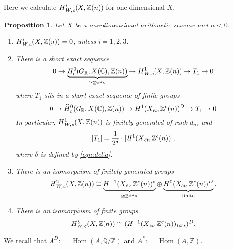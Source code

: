 \documentclass[draft]{article}
\DeclareMathOperator{\Hom}{Hom}
\newcommand{\CC}{\mathbb{C}}
\newcommand{\QQ}{\mathbb{Q}}
\newcommand{\RR}{\mathbb{R}}
\newcommand{\ZZ}{\mathbb{Z}}
\newcommand{\et}{\text{\it \'{e}t}}
\newcommand{\tors}{\text{\it tors}}
\newcommand{\Wc}{\text{\it W,c}}
\newcommand{\dfn}{\mathrel{\mathop:}=}
\theoremstyle{myplain}
\newtheorem{proposition}[theorem]{Proposition}
\theoremstyle{mydefinition}
\numberwithin{equation}{section}
\begin{document}
Here we calculate $H^i_\Wc (X, \ZZ(n))$ for one-dimensional $X$.

\begin{proposition}
  \label{prop:calculation-of-H-Wc}
  Let $X$ be a one-dimensional arithmetic scheme and $n < 0$.

  \begin{enumerate}
  \item[0)] $H^i_\Wc (X, \ZZ(n)) = 0$, unless $i = 1,2,3$.

  \item[1)] There is a short exact sequence
    \begin{equation}
      \label{eqn:H1Wc-ses}
      0 \to \underbrace{H^0_c (G_\RR, X(\CC), \ZZ(n))}_{\cong \ZZ^{\oplus d_n}} \to
      H^1_\Wc (X, \ZZ(n)) \to T_1 \to 0
    \end{equation}
    where $T_1$ sits in a short exact sequence of finite groups
    \[ 0 \to \widehat{H}^0_c (G_\RR, X(\CC), \ZZ(n)) \to
      H^1 (X_\et, \ZZ^c(n))^D \to
      T_1 \to 0 \]
    In particular, $H^1_\Wc (X, \ZZ(n))$ is finitely generated of rank $d_n$,
    and
    $$|T_1| = \frac{1}{2^\delta}\cdot |H^1 (X_\et, \ZZ^c (n))|,$$
    where $\delta$ is defined by \eqref{eqn:delta}.

  \item[2)] There is an isomorphism of finitely generated groups
    \[ H^2_\Wc (X, \ZZ(n)) \cong
      \underbrace{H^{-1} (X_\et, \ZZ^c(n))^*}_{\cong \ZZ^{\oplus d_n}}
      \oplus
      \underbrace{H^0 (X_\et, \ZZ^c(n))^D}_{\text{finite}}. \]

  \item[3)] There is an isomorphism of finite groups
    $$H^3_\Wc (X, \ZZ(n)) \cong (H^{-1} (X_\et, \ZZ^c(n))_\tors)^D.$$
  \end{enumerate}
\end{proposition}

We recall that $A^D \dfn \Hom (A, \QQ/\ZZ)$ and $A^* \dfn \Hom (A, \ZZ)$.
\end{document}
